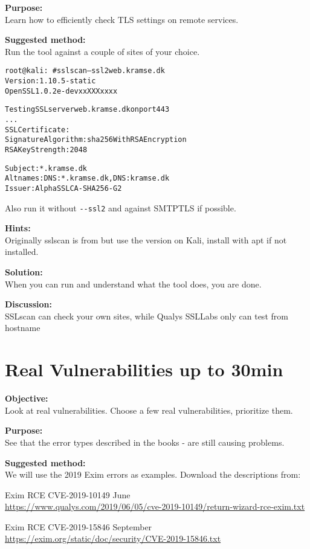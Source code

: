 \documentclass[a4paper,11pt,notitlepage]{report}
\begin{document}
{\bf Purpose:}\\
Learn how to efficiently check TLS settings on remote services.

{\bf Suggested method:}\\
Run the tool against a couple of sites of your choice.

\begin{alltt}\small
root@kali:~# sslscan --ssl2 web.kramse.dk
Version: 1.10.5-static
OpenSSL 1.0.2e-dev xx XXX xxxx

Testing SSL server web.kramse.dk on port 443
...
  SSL Certificate:
Signature Algorithm: sha256WithRSAEncryption
RSA Key Strength:    2048

Subject:  *.kramse.dk
Altnames: DNS:*.kramse.dk, DNS:kramse.dk
Issuer:   AlphaSSL CA - SHA256 - G2
\end{alltt}

Also run it without \verb+--ssl2+ and against SMTPTLS if possible.

{\bf Hints:}\\
Originally sslscan is from  but use the version on Kali, install with apt if not installed.

{\bf Solution:}\\
When you can run and understand what the tool does, you are done.

{\bf Discussion:}\\
SSLscan can check your own sites, while Qualys SSLLabs only can test from hostname


\chapter{Real Vulnerabilities up to 30min}
\label{ex:real-vulns}



{\bf Objective:}\\
Look at real vulnerabilities. Choose a few real vulnerabilities, prioritize them.

{\bf Purpose:}\\
See that the error types described in the books - are still causing problems.



{\bf Suggested method:}\\
We will use the 2019 Exim errors as examples. Download the descriptions from:
\begin{list2}
\item Exim RCE CVE-2019-10149 June\\ \url{https://www.qualys.com/2019/06/05/cve-2019-10149/return-wizard-rce-exim.txt}

\item Exim RCE CVE-2019-15846 September\\
\url{https://exim.org/static/doc/security/CVE-2019-15846.txt}
\end{list2}
\end{document}

